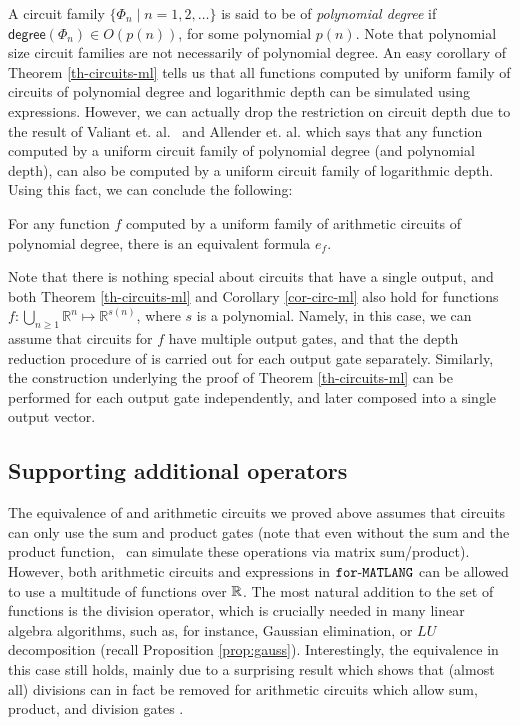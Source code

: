 A circuit family $\{\Phi_n\mid n=1,2,\ldots\}$ is said to be of \textit{polynomial degree} if $\mathsf{degree}(\Phi_n)\in O(p(n))$, for some polynomial $p(n)$. Note that polynomial size circuit families are not necessarily of polynomial degree. An easy corollary of Theorem \ref{th-circuits-ml} tells us that all functions computed by uniform family of circuits of polynomial degree and logarithmic depth can be simulated using \langfor expressions. However, we can actually drop the restriction on circuit depth due to the result of Valiant et. al.~\cite{valiant1981fast} and Allender et. al. \cite{AllenderJMV98} which says that any function computed by a uniform circuit family of polynomial degree (and polynomial depth), can also be computed by a uniform circuit family of logarithmic depth. Using this fact, we can conclude the following:


\begin{corollary}
\label{cor-circ-ml}
For any function $f$ computed by a uniform family of arithmetic circuits of polynomial degree, there is an equivalent \langfor formula $e_f$.
\end{corollary}

Note that there is nothing special about circuits that have a single output, and both Theorem \ref{th-circuits-ml} and Corollary \ref{cor-circ-ml} also hold for functions  $f:\bigcup_{n\geq 1} \mathbb{R}^n\mapsto\mathbb{R}^{s(n)}$, where $s$ is a polynomial. Namely, in this case, we can assume that circuits for $f$ have multiple output gates, and that the depth reduction procedure of \cite{AllenderJMV98} is carried out for each output gate separately. Similarly, the construction underlying the proof of Theorem \ref{th-circuits-ml} can be performed for each output gate independently, and later composed into a single output vector.

\subsection{Supporting additional operators}\label{subsec:additionalop}
The equivalence of \langfor and arithmetic circuits we proved above assumes that circuits can only use the sum and product gates (note that even without the sum and the product function, \langfor\ can simulate these operations via matrix sum/product). However, both arithmetic circuits and expressions in $\texttt{for}\text{-}\texttt{MATLANG}$ can be allowed to use a multitude of functions over $\mathbb{R}$. The most natural addition to the set of functions is the division operator, which is crucially needed in many linear algebra algorithms, such as, for instance, Gaussian elimination, or $LU$ decomposition (recall Proposition \ref{prop:gauss}).
Interestingly, the equivalence in this case still holds, mainly due to a surprising result which shows that (almost all) divisions can in fact be removed for arithmetic circuits which allow sum, product, and division gates \cite{allender}.

